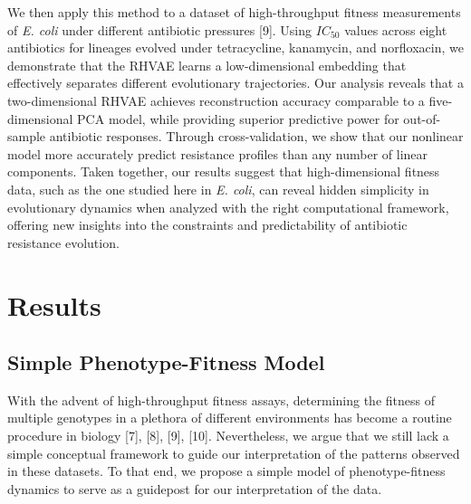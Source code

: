 \documentclass[
]{scrartcl}
\begin{document}
\begin{refsegment}
We then apply this method to a dataset of high-throughput fitness
measurements of \emph{E. coli} under different antibiotic pressures
{[}9{]}. Using \(IC_{50}\) values across eight antibiotics for lineages
evolved under tetracycline, kanamycin, and norfloxacin, we demonstrate
that the RHVAE learns a low-dimensional embedding that effectively
separates different evolutionary trajectories. Our analysis reveals that
a two-dimensional RHVAE achieves reconstruction accuracy comparable to a
five-dimensional PCA model, while providing superior predictive power
for out-of-sample antibiotic responses. Through cross-validation, we
show that our nonlinear model more accurately predict resistance
profiles than any number of linear components. Taken together, our
results suggest that high-dimensional fitness data, such as the one
studied here in \emph{E. coli}, can reveal hidden simplicity in
evolutionary dynamics when analyzed with the right computational
framework, offering new insights into the constraints and predictability
of antibiotic resistance evolution.

\section{Results}\label{results}

\subsection{Simple Phenotype-Fitness
Model}\label{simple-phenotype-fitness-model}

With the advent of high-throughput fitness assays, determining the
fitness of multiple genotypes in a plethora of different environments
has become a routine procedure in biology {[}7{]}, {[}8{]}, {[}9{]},
{[}10{]}. Nevertheless, we argue that we still lack a simple conceptual
framework to guide our interpretation of the patterns observed in these
datasets. To that end, we propose a simple model of phenotype-fitness
dynamics to serve as a guidepost for our interpretation of the data.


\end{refsegment}
\end{document}

